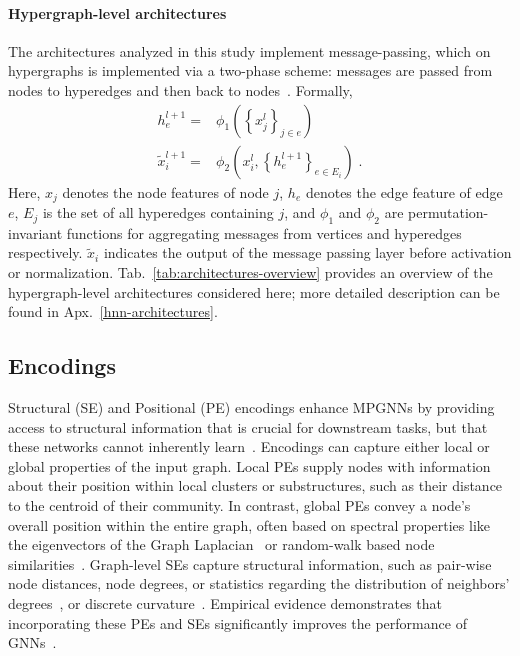 \paragraph{Hypergraph-level architectures}
The architectures analyzed in this study implement message-passing, which on hypergraphs is implemented via a two-phase scheme: messages are passed from nodes to hyperedges and then back to nodes~\citep{huang2021unignn}. Formally,
\begin{align}\label{two-phase-scheme}
h_e^{l+1} =& \phi_1 \left( \left\{ x_j^l \right \}_{j \in e}\right)\\
\tilde{x}_i^{l+1} = &\phi_2 \left(x_i^l, \left\{h_e^{l+1}\right\}_{e \in E_i} \right) \; . \nonumber
\end{align}
Here, $x_j$ denotes the node features of node $j$, $h_e$ denotes the edge feature of edge $e$, $E_j$ is the set of all hyperedges containing $j$, and $\phi_1$ and $\phi_2$ are permutation-invariant functions for aggregating messages from vertices and hyperedges respectively.  $\tilde{x}_i$ indicates the output of the message passing layer before activation or normalization. Tab.~\ref{tab:architectures-overview} provides an overview of the hypergraph-level architectures considered here; more detailed description can be found in Apx.~\ref{hnn-architectures}.


\subsection{Encodings}

Structural (SE) and Positional (PE) encodings enhance MPGNNs by providing access to structural information that is crucial for downstream tasks, but that these networks cannot inherently learn~\citep{dwivedi2023benchmarking, rampavsek2022recipe}. Encodings can capture either local or global properties of the input graph. Local PEs supply nodes with information about their position within local clusters or substructures, such as their distance to the centroid of their community. In contrast, global PEs convey a node's overall position within the entire graph, often based on spectral properties like the eigenvectors of the Graph Laplacian~\citep{kreuzer2021rethinking} or random-walk based node similarities~\citep{dwivedi2021graph}. Graph-level SEs capture structural information, such as pair-wise node distances, node degrees, or statistics regarding the distribution of neighbors’ degrees~\citep{cai2018simple}, or discrete curvature~\citep{fesser2023effective}. Empirical evidence demonstrates that incorporating these PEs and SEs significantly improves the performance of GNNs~\citep{rampavsek2022recipe}.

